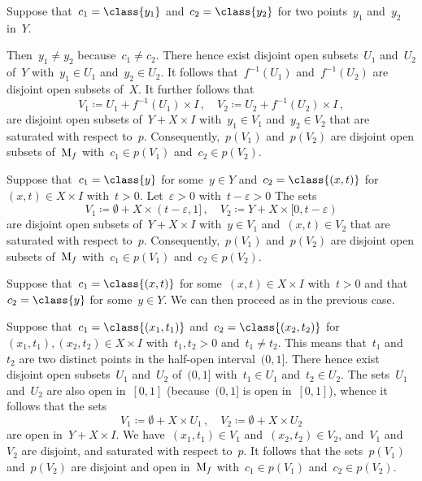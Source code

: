 \begin{casedistinction}

	\item
		Suppose that~$c_1 = \class{y_1}$ and~$c_2 = \class{y_2}$ for two points~$y_1$ and~$y_2$ in~$Y$.

		Then~$y_1 ≠ y_2$ because~$c_1 ≠ c_2$.
		There hence exist disjoint open subsets~$U_1$ and~$U_2$ of~$Y$ with~$y_1 ∈ U_1$ and~$y_2 ∈ U_2$.
		It follows that~$f^{-1}(U_1)$ and~$f^{-1}(U_2)$ are disjoint open subsets of~$X$.
		It further follows that
		\[
			V_1 ≔ U_1 + f^{-1}(U_1) × I \,,
			\quad
			V_2 ≔ U_2 + f^{-1}(U_2) × I \,,
		\]
		are disjoint open subsets of~$Y + X × I$ with~$y_1 ∈ V_1$ and~$y_2 ∈ V_2$ that are saturated with respect to~$p$.
		Consequently,~$p(V_1)$ and~$p(V_2)$ are disjoint open subsets of~$\operatorname{M}_f$ with~$c_1 ∈ p(V_1)$ and~$c_2 ∈ p(V_2)$.

	\item
		Suppose that~$c_1 = \class{y}$ for some~$y ∈ Y$ and~$c_2 = \class{(x, t)}$ for~$(x, t) ∈ X × I$ with~$t > 0$.
		Let~$ε > 0$ with~$t - ε > 0$
		The sets
		\[
			V_1 ≔ ∅ + X × ( t - ε, 1 ] \,,
			\quad
			V_2 ≔ Y + X × [ 0, t - ε )
		\]
		are disjoint open subsets of~$Y + X × I$ with~$y ∈ V_1$ and~$(x, t) ∈ V_2$ that are saturated with respect to~$p$.
		Consequently,~$p(V_1)$ and~$p(V_2)$ are disjoint open subsets of~$\operatorname{M}_f$ with~$c_1 ∈ p(V_1)$ and~$c_2 ∈ p(V_2)$.

	\item
		Suppose that~$c_1 = \class{(x, t)}$ for some~$(x, t) ∈ X × I$ with~$t > 0$ and that~$c_2 = \class{y}$ for some~$y ∈ Y$.
		We can then proceed as in the previous case.

	\item
		Suppose that~$c_1 = \class{(x_1, t_1)}$ and~$c_2 = \class{(x_2, t_2)}$ for~$(x_1, t_1), (x_2, t_2) ∈ X × I$ with~$t_1, t_2 > 0$ and~$t_1 ≠ t_2$.
		This means that~$t_1$ and~$t_2$ are two distinct points in the half-open interval~$(0, 1]$.
		There hence exist disjoint open subsets~$U_1$ and~$U_2$ of~$(0, 1]$ with~$t_1 ∈ U_1$ and~$t_2 ∈ U_2$.
		The sets~$U_1$ and~$U_2$ are also open in~$[0, 1]$ (because~$(0, 1]$ is open in~$[0, 1]$), whence it follows that the sets
		\[
			V_1 ≔ ∅ + X × U_1 \,,
			\quad
			V_2 ≔ ∅ + X × U_2
		\]
		are open in~$Y + X × I$.
		We have~$(x_1, t_1) ∈ V_1$ and~$(x_2, t_2) ∈ V_2$, and~$V_1$ and~$V_2$ are disjoint, and saturated with respect to~$p$.
		It follows that the sets~$p(V_1)$ and~$p(V_2)$ are disjoint and open in~$\operatorname{M}_f$ with~$c_1 ∈ p(V_1)$ and~$c_2 ∈ p(V_2)$.


\end{casedistinction}
